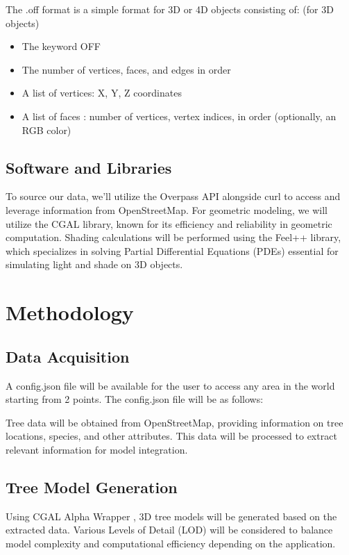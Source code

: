 \documentclass[12pt]{article}
\begin{document}
The .off format\cite{off_format} is a simple format for 3D or 4D objects consisting of: (for 3D objects)
\begin{itemize}
    \item The keyword OFF
    \item The number of vertices, faces, and edges in order 
    \item A list of vertices: X, Y, Z coordinates
    \item A list of faces : number of vertices, vertex indices, in order (optionally, an RGB color)
\end{itemize}

\subsection{Software and Libraries}
To source our data, we'll utilize the Overpass API \cite{overpass} alongside
curl \cite{curl} to access and leverage information from OpenStreetMap.
For geometric modeling, we will utilize the CGAL \cite{cgal} library, known for its efficiency and 
reliability in geometric computation. Shading calculations will be performed using the 
Feel++ \cite{feel++} library, which specializes in solving Partial Differential Equations (PDEs) 
essential for simulating light and shade on 3D objects.

\newpage

\section{Methodology}

\subsection{Data Acquisition}
A config.json file will be available for the user to access any area in the
world starting from 2 points. The config.json file will be as follows:

    

Tree data will be obtained from OpenStreetMap, providing information on tree locations, 
species, and other attributes. This data will be processed to extract relevant 
information for model integration.

\subsection{Tree Model Generation}
Using CGAL Alpha Wrapper \cite{cgal_alpha_wrapper}, 3D tree models will be generated based on the extracted data. Various 
Levels of Detail (LOD) will be considered to balance model complexity and computational 
efficiency depending on the application.
\end{document}
